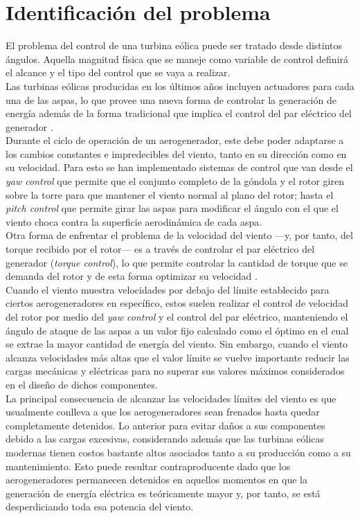 \section{Identificación del problema}
{\parindent0pt
El problema del control de una turbina eólica puede ser tratado desde distintos ángulos. Aquella magnitud física que se maneje como variable de control definirá el alcance y el tipo del control que se vaya a realizar. 
\\

Las turbinas eólicas producidas en los últimos años incluyen actuadores para cada una de las aspas, lo que provee una nueva forma de controlar la generación de energía además de la forma tradicional que implica el control del par eléctrico del generador \cite{Laks2009}.
\\

Durante el ciclo de operación de un aerogenerador, este debe poder adaptarse a los cambios constantes e impredecibles del viento, tanto en su dirección como en su velocidad. Para esto se han implementado sistemas de control que van desde el \emph{yaw control} que permite que el conjunto completo de la góndola y el rotor giren sobre la torre para que mantener el viento normal al plano del rotor; hasta el \emph{pitch control} que permite girar las aspas para modificar el ángulo con el que el viento choca contra la superficie aerodinámica de cada aspa. 
\\

Otra forma de enfrentar el problema de la velocidad del viento —y, por tanto, del torque recibido por el rotor— es a través de controlar el par eléctrico del generador (\emph{torque control}), lo que permite controlar la cantidad de torque que se demanda del rotor y de esta forma optimizar su velocidad \cite{Johnson2004}.
\\

Cuando el viento muestra velocidades por debajo del límite establecido para ciertos aerogeneradores en específico, estos suelen realizar el control de velocidad del rotor por medio del \emph{yaw control} y el control del par eléctrico, manteniendo el ángulo de ataque de las aspas a un valor fijo calculado como el óptimo en el cual se extrae la mayor cantidad de energía del viento. Sin embargo, cuando el viento alcanza velocidades más altas que el valor límite se vuelve importante reducir las cargas mecánicas y eléctricas para no superar sus valores máximos considerados en el diseño de dichos componentes. 
\\

La principal consecuencia de alcanzar las velocidades límites del viento es que usualmente conlleva a que los aerogeneradores sean frenados hasta quedar completamente detenidos. Lo anterior para evitar daños a sus componentes debido a las cargas excesivas, considerando además que las turbinas eólicas modernas tienen costos bastante altos asociados tanto a su producción como a su mantenimiento. Esto puede resultar contraproducente dado que los aerogeneradores permanecen detenidos en aquellos momentos en que la generación de energía eléctrica es teóricamente mayor y, por tanto, se está desperdiciando toda esa potencia del viento.


}


